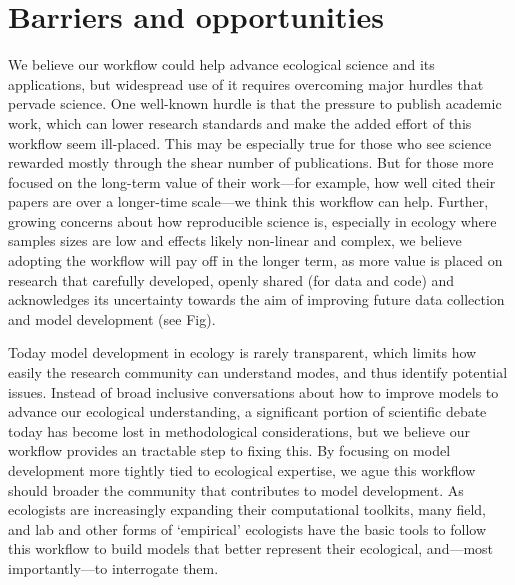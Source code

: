 \documentclass[11pt]{article}
\begin{document}
\section{Barriers and opportunities}

We believe our workflow could help advance ecological science and its applications, but widespread use of it requires overcoming major hurdles that pervade science.  
One well-known hurdle is that the pressure to publish academic work, which can lower research standards and make the added effort of this workflow seem ill-placed. This may be especially true for those who see science rewarded mostly through the shear number of publications. But for those more focused on the long-term value of their work---for example, how well cited their papers are over a longer-time scale---we think this workflow can help. Further, growing concerns about how reproducible science is, especially in ecology where samples sizes are low and effects likely non-linear and complex, we believe adopting the workflow will pay off in the longer term, as more value is placed on research that carefully developed, openly shared (for data and code) and acknowledges its uncertainty towards the aim of improving future data collection and model development (see Fig). 

Today model development in ecology is rarely transparent, which limits how easily the research community can understand modes, and thus identify potential issues. Instead of broad inclusive conversations about how to improve models to advance our ecological understanding, a significant portion of scientific debate today has become lost in methodological considerations, but we believe our workflow provides an tractable step to fixing this. By focusing on model development more tightly tied to ecological expertise, we ague this workflow should broader the community that contributes to model development. As ecologists are increasingly expanding their computational toolkits, many field, and lab and other forms of `empirical' ecologists have the basic tools to follow this workflow to build models that better represent their ecological, and---most importantly---to interrogate them.
\end{document}
